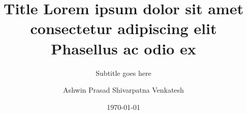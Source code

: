 \title{Title Lorem ipsum dolor sit amet consectetur adipiscing elit Phasellus ac odio ex} 

\subtitle{Subtitle goes here}

\author{Ashwin Prasad Shivarpatna Venkatesh}


\date{\today} 

\newcommand{\upbcolor}{uni-blue} 

